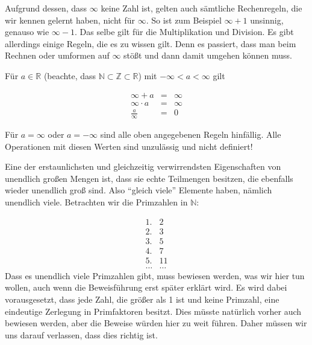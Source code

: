 Aufgrund dessen, dass $\infty$ keine Zahl ist, gelten auch sämtliche Rechenregeln, die wir kennen gelernt haben, nicht für $\infty$. So ist zum Beispiel $\infty +1$ unsinnig, genauso wie $\infty-1$. Das selbe gilt für die Multiplikation und Division. Es gibt allerdings einige Regeln, die es zu wissen gilt. Denn es passiert, dass man beim Rechnen oder umformen auf $\infty$ stößt und dann damit umgehen können muss. 

Für $a\in \mathbb{R}$ (beachte, dass $\mathbb{N} \subset \mathbb{Z} \subset \mathbb{R}$) mit $-\infty < a < \infty$ gilt

\begin{eqnarray*}
\infty + a &=& \infty \\
\infty \cdot a &=& \infty \\
\frac{a}{\infty} &=& 0
\end{eqnarray*}

Für $a=\infty$ oder $a=-\infty$ sind alle oben angegebenen Regeln hinfällig. Alle Operationen mit diesen Werten sind unzulässig und nicht definiert!

Eine der erstaunlichsten und gleichzeitig verwirrendsten Eigenschaften von unendlich großen Mengen ist, dass sie echte Teilmengen besitzen, die ebenfalls wieder unendlich groß sind. Also "`gleich viele"' Elemente haben, nämlich unendlich viele. Betrachten wir die Primzahlen in $\mathbb{N}$:

\begin{eqnarray*}
1. & 2 \\
2. & 3 \\
3. & 5 \\
4. & 7 \\
5. & 11 \\
\dots & \dots
\end{eqnarray*}
Dass es unendlich viele Primzahlen gibt, muss bewiesen werden, was wir hier tun wollen, auch wenn die Beweisführung erst später erklärt wird. Es wird dabei vorausgesetzt, dass jede Zahl, die größer als 1 ist und keine Primzahl, eine eindeutige Zerlegung in Primfaktoren besitzt. Dies müsste natürlich vorher auch bewiesen werden, aber die Beweise würden hier zu weit führen. Daher müssen wir uns darauf verlassen, dass dies richtig ist. 

